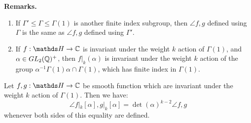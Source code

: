 \documentclass[10pt,a4paper]{article}
\begin{document}
\textbf{Remarks.}
\begin{enumerate}
  \item If $\Gamma' \leq \Gamma \leq \Gamma(1)$ is another finite index subgroup, then $\angle{f, g}$ defined using $\Gamma$ is the same as $\angle{f,g}$ defined using $\Gamma'$.
  \item If $f:\H \to \C$ is invariant under the weight $k$ action of $\Gamma(1)$, and $\alpha \in GL_2(\mathbb{Q})^+$, then $f|_k(\alpha)$ is invariant under the weight $k$ action of the group $\alpha^{-1}\Gamma(1)\alpha \cap \Gamma(1)$, which has finite index in $\Gamma(1)$.
\end{enumerate}
\begin{proposition}
  Let $f, g:\H \to \C$ be smooth function which are invariant under the weight $k$ action of $\Gamma(1)$. Then we have:
  \[\angle{f|_k[\alpha], g|_k[\alpha]} = \det(\alpha)^{k-2}\angle{f,g}\]
  whenever both sides of this equality are defined.
\end{proposition}
\end{document}
